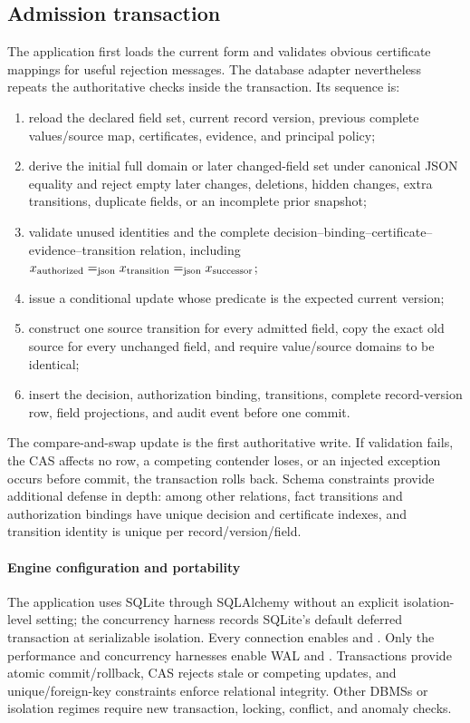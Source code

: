 \subsection{Admission transaction}

The application first loads the current form and validates obvious certificate mappings for useful rejection messages. The database adapter nevertheless repeats the authoritative checks inside the transaction. Its sequence is:

\begin{enumerate}[leftmargin=*]
  \item reload the declared field set, current record version, previous complete values/source map, certificates, evidence, and principal policy;
  \item derive the initial full domain or later changed-field set under canonical JSON equality and reject empty later changes, deletions, hidden changes, extra transitions, duplicate fields, or an incomplete prior snapshot;
  \item validate unused identities and the complete decision--binding--certificate--evidence--transition relation, including
  $x_{\mathrm{authorized}}\mathrel{=_{\mathrm{json}}} x_{\mathrm{transition}}\mathrel{=_{\mathrm{json}}} x_{\mathrm{successor}}$;
  \item issue a conditional update whose predicate is the expected current version;
  \item construct one source transition for every admitted field, copy the exact old source for every unchanged field, and require value/source domains to be identical;
  \item insert the decision, authorization binding, transitions, complete record-version row, field projections, and audit event before one commit.
\end{enumerate}

The compare-and-swap update is the first authoritative write. If validation fails, the CAS affects no row, a competing contender loses, or an injected exception occurs before commit, the transaction rolls back. Schema constraints provide additional defense in depth: among other relations, fact transitions and authorization bindings have unique decision and certificate indexes, and transition identity is unique per record/version/field.

\paragraph{Engine configuration and portability}
The application uses SQLite through SQLAlchemy without an explicit isolation-level setting; the concurrency harness records SQLite's default deferred transaction at serializable isolation. Every connection enables  and . Only the performance and concurrency harnesses enable WAL and . Transactions provide atomic commit/rollback, CAS rejects stale or competing updates, and unique/foreign-key constraints enforce relational integrity. Other DBMSs or isolation regimes require new transaction, locking, conflict, and anomaly checks.

